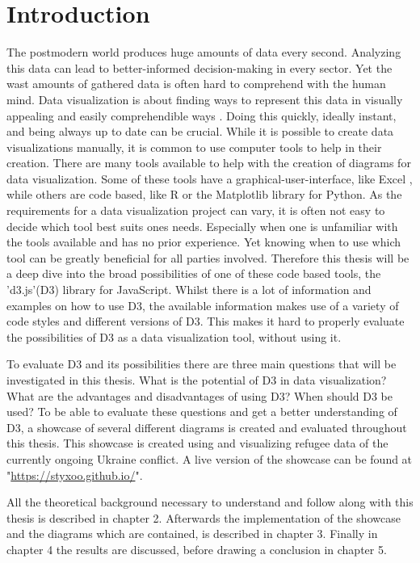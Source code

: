 \chapter{Introduction}


The postmodern world produces huge amounts of data every second. Analyzing this data can lead to better-informed decision-making in every sector. Yet the wast amounts of gathered data is often hard to comprehend with the human mind. Data visualization is about finding ways to represent this data in visually appealing and easily comprehendible ways \cite{sadiku2016data}. Doing this quickly, ideally instant, and being always up to date can be crucial. While it is possible to create data visualizations manually, it is common to use computer tools to help in their creation. There are many tools available to help with the creation of diagrams for data visualization. Some of these tools have a graphical-user-interface, like Excel \cite{excel}, while others are code based, like R \cite{r} or the Matplotlib \cite{matplotlib} library for Python. As the requirements for a data visualization project can vary, it is often not easy to decide which tool best suits ones needs. Especially when one is unfamiliar with the tools available and has no prior experience. Yet knowing when to use which tool can be greatly beneficial for all parties involved. Therefore this thesis will be a deep dive into the broad possibilities of one of these code based tools, the 'd3.js'(D3) library for JavaScript. Whilst there is a lot of information and examples on how to use D3, the available information makes use of a variety of code styles and different versions of D3. This makes it hard to properly evaluate the possibilities of D3 as a data visualization tool, without using it.

To evaluate D3 and its possibilities there are three main questions that will be investigated in this thesis. What is the potential of D3 in data visualization? What are the advantages and disadvantages of using D3? When should D3 be used? To be able to evaluate these questions and get a better understanding of D3, a showcase of several different diagrams is created and evaluated throughout this thesis. This showcase is created using and visualizing refugee data of the currently ongoing Ukraine conflict. A live version of the showcase can be found at "\url{https://styxoo.github.io/}".

All the theoretical background necessary to understand and follow along with this thesis is described in chapter 2. Afterwards the implementation of the showcase and the diagrams which are contained, is described in chapter 3. Finally in chapter 4 the results are discussed, before drawing a conclusion in chapter 5.
